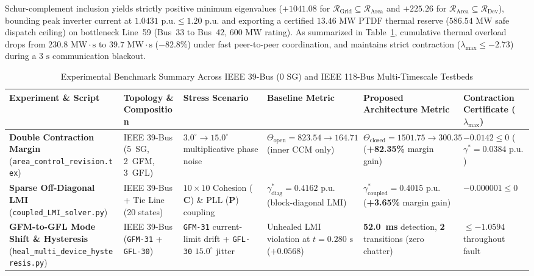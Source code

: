 \documentclass[journal]{IEEEtran}
\begin{document}
Schur-complement inclusion yields strictly positive minimum eigenvalues ($+1041.08$ for $\mathcal{R}_{\text{Grid}} \subseteq \mathcal{R}_{\text{Area}}$ and $+225.26$ for $\mathcal{R}_{\text{Area}} \subseteq \mathcal{R}_{\text{Dev}}$), bounding peak inverter current at $1.0431\text{ p.u.} \le 1.20\text{ p.u.}$ and exporting a certified $13.46\text{ MW}$ PTDF thermal reserve ($586.54\text{ MW}$ safe dispatch ceiling) on bottleneck Line~59 (Bus~33 to Bus~42, $600\text{ MW}$ rating). As summarized in Table~\ref{tab:benchmark_summary}, cumulative thermal overload drops from $230.8\text{ MW}\cdot\text{s}$ to $39.7\text{ MW}\cdot\text{s}$ ($-82.8\%$) under fast peer-to-peer coordination, and maintains strict contraction ($\lambda_{\max} \le -2.73$) during a $3\text{ s}$ communication blackout.

\begin{table}[!t]
\centering
\caption{Experimental Benchmark Summary Across IEEE 39-Bus ($0\text{ SG}$) and IEEE 118-Bus Multi-Timescale Testbeds}
\label{tab:benchmark_summary}
\footnotesize
\renewcommand{\arraystretch}{1.16}
\begin{tabularx}{\textwidth}{>{\raggedright\arraybackslash}p{2.9cm} >{\raggedright\arraybackslash}p{2.7cm} >{\raggedright\arraybackslash}p{2.8cm} >{\raggedright\arraybackslash}p{2.6cm} >{\raggedright\arraybackslash}X >{\raggedright\arraybackslash}p{2.3cm}}
\toprule
\textbf{Experiment \& Script} & \textbf{Topology \& Composition} & \textbf{Stress Scenario} & \textbf{Baseline Metric} & \textbf{Proposed Architecture Metric} & \textbf{Contraction Certificate ($\lambda_{\max}$)} \\
\midrule
\textbf{Double Contraction Margin} (\texttt{area\_control\_revision.tex}) & IEEE 39-Bus (5~SG, 2~GFM, 3~GFL) & $3.0^\circ \to 15.0^\circ$ multiplicative phase noise & $\Theta_{\text{open}} = 823.54 \to 164.71$ (inner CCM only) & $\Theta_{\text{closed}} = 1501.75 \to 300.35$ (\textbf{+82.35\%} margin gain) & $-0.0142 \le 0$ ($\gamma^* = 0.0384\text{ p.u.}$) \\
\addlinespace[1.5pt]
\textbf{Sparse Off-Diagonal LMI} (\texttt{coupled\_LMI\_solver.py}) & IEEE 39-Bus + Tie Line (20 states) & $10 \times 10$ Cohesion ($\mathbf{C}$) \& PLL ($\mathbf{P}$) coupling & $\gamma_{\text{diag}}^* = 0.4162\text{ p.u.}$ (block-diagonal LMI) & $\gamma_{\text{coupled}}^* = 0.4015\text{ p.u.}$ (\textbf{+3.65\%} margin gain) & $-0.000001 \le 0$ \\
\addlinespace[1.5pt]
\textbf{GFM-to-GFL Mode Shift \& Hysteresis} (\texttt{heal\_multi\_device\_hysteresis.py}) & IEEE 39-Bus (\texttt{GFM-31} + \texttt{GFL-30}) & \texttt{GFM-31} current-limit drift + \texttt{GFL-30} $15.0^\circ$ jitter & Unhealed LMI violation at $t = 0.280\text{ s}$ ($+0.0568$) & \textbf{52.0~ms} detection, \textbf{2} transitions (zero chatter) & $\le -1.0594$ throughout fault \\

\end{tabularx}
\end{table}
\end{document}
